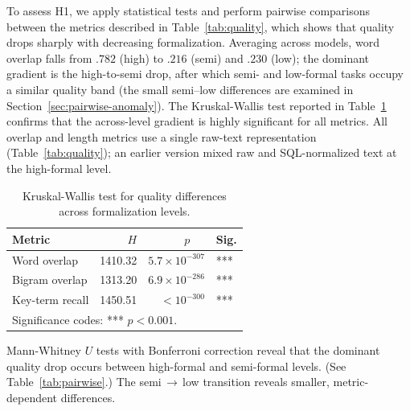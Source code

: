 \documentclass[runningheads]{llncs}
\begin{document}
To assess H1, we apply statistical tests and perform pairwise comparisons between the metrics described in Table~\ref{tab:quality}, which shows that quality drops sharply with decreasing formalization. Averaging across models, word overlap falls from $.782$ (high) to $.216$ (semi) and $.230$ (low); the dominant gradient is the high-to-semi drop, after which semi- and low-formal tasks occupy a similar quality band (the small semi--low differences are examined in Section~\ref{sec:pairwise-anomaly}). The Kruskal-Wallis test reported in Table~\ref{tab:kruskal} confirms that the across-level gradient is highly significant for all metrics. All overlap and length metrics use a single raw-text representation (Table~\ref{tab:quality}); an earlier version mixed raw and SQL-normalized text at the high-formal level.

\begin{table}[htbp]
\centering
\caption{Kruskal-Wallis test for quality differences across formalization levels.}
\label{tab:kruskal}
\setlength{\tabcolsep}{5pt}
\begin{tabular}{lrrl}
\toprule
Metric & $H$ & $p~~~~~~$ & Sig. \\
\midrule
Word overlap    & 1410.32 & $5.7 \times 10^{-307}$ & *** \\
Bigram overlap  & 1313.20 & $6.9 \times 10^{-286}$ & *** \\
Key-term recall & 1450.51 & $< 10^{-300}$ & *** \\
\bottomrule
\multicolumn{4}{l}{\scriptsize Significance codes: *** $p < 0.001$.}
\end{tabular}
\end{table}

Mann-Whitney $U$ tests with Bonferroni correction reveal that the dominant quality drop occurs between high-formal and semi-formal levels. (See Table~\ref{tab:pairwise}.) The semi$\,\to\,$low transition reveals smaller, metric-dependent differences.
\end{document}
